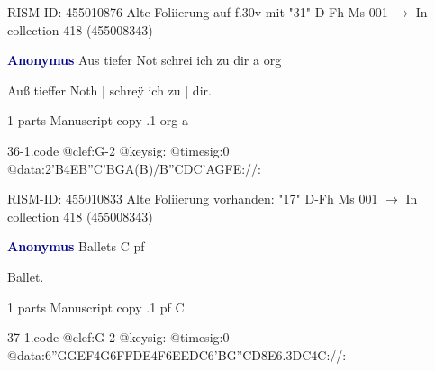 \documentclass[twocolumn]{book}
\begin{document}
\newline RISM-ID: 455010876
\newline Alte Foliierung auf f.30v mit "31"
\newline D-Fh  Ms 001
\newline $\rightarrow$ In collection 418 (455008343)

\newline \par \vspace{7pt} \textcolor{darkblue}{\textbf{Anonymus  }}
\newline Aus tiefer Not schrei ich zu dir  a  
\newline org
\newline \begin{itshape}[f.17r, at left:] Auß tieffer Noth | schreÿ ich zu | dir.\end{itshape} 
\newline \textcolor{darkblue}{}  1 parts  
\newline Manuscript copy
.1  org  a  
\begin{filecontents*}{36-1.code}
@clef:G-2
@keysig:
@timesig:0
@data:2'B4EB''C'BGA(B)/B''CDC'AGFE://:
\end{filecontents*}
\newline
%

\newline RISM-ID: 455010833
\newline Alte Foliierung vorhanden: "17"
\newline D-Fh  Ms 001
\newline $\rightarrow$ In collection 418 (455008343)

\newline \par \vspace{7pt} \textcolor{darkblue}{\textbf{Anonymus  }}
\newline Ballets  C  
\newline pf
\newline \begin{itshape}[f.57v, at left:] Ballet.\end{itshape} 
\newline \textcolor{darkblue}{}  1 parts  
\newline Manuscript copy
.1  pf  C  
\begin{filecontents*}{37-1.code}
@clef:G-2
@keysig:
@timesig:0
@data:{6''GGEF}4G{6FFDE}4F{6EEDC}{6'BG''CD}{8E6.3DC}4C://:
\end{filecontents*}
\newline
%
\end{document}
